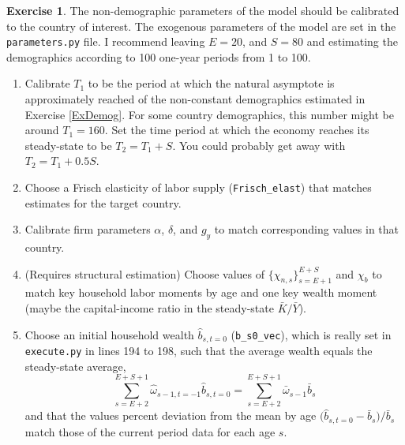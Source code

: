 \documentclass[letterpaper,12pt]{article}
\theoremstyle{definition}
\newtheorem{exercise}[theorem]{Exercise}
\begin{document}
  \begin{exercise}\label{ExCalib1}
    The non-demographic parameters of the model should be calibrated to the country of interest. The exogenous parameters of the model are set in the \texttt{parameters.py} file. I recommend leaving $E=20$, and $S=80$ and estimating the demographics according to 100 one-year periods from 1 to 100.
    \begin{enumerate}
      \item Calibrate $T_1$ to be the period at which the natural asymptote is approximately reached of the non-constant demographics estimated in Exercise \ref{ExDemog}. For some country demographics, this number might be around $T_1=160$. Set the time period at which the economy reaches its steady-state to be $T_2=T_1 + S$. You could probably get away with $T_2=T_1 + 0.5S$.
      \item Choose a Frisch elasticity of labor supply (\texttt{Frisch\_elast}) that matches estimates for the target country.
      \item Calibrate firm parameters $\alpha$, $\delta$, and $g_y$ to match corresponding values in that country.
      \item (Requires structural estimation) Choose values of $\{\chi_{n,s}\}_{s=E+1}^{E+S}$ and $\chi_b$ to match key household labor moments by age and one key wealth moment (maybe the capital-income ratio in the steady-state $\bar{K}/\bar{Y}$).
      \item Choose an initial household wealth $\hat{b}_{s,t=0}$ (\texttt{b\_s0\_vec}), which is really set in \texttt{execute.py} in lines 194 to 198, such that the average wealth equals the steady-state average,
      \begin{equation*}
        \sum_{s=E+2}^{E+S+1}\hat{\omega}_{s-1,t=-1}\hat{b}_{s,t=0} = \sum_{s=E+2}^{E+S+1}\bar{\omega}_{s-1}\bar{b}_{s}
      \end{equation*}
      and that the values percent deviation from the mean by age $\bigl(\hat{b}_{s,t=0} - \bar{b}_s\bigr)/\bar{b}_s$ match those of the current period data for each age $s$.
    \end{enumerate}
  \end{exercise}
\end{document}
